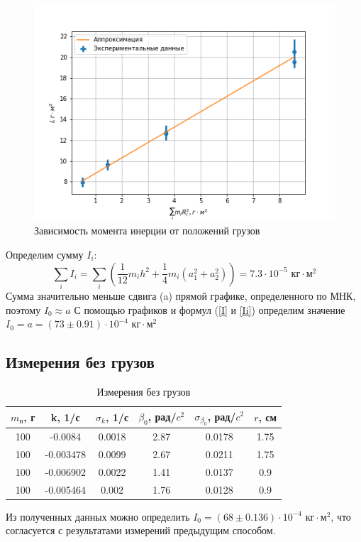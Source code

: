 \documentclass[a4paper,12pt]{article} %
\begin{document}
\begin{figure}[h!]
\begin{center}
\includegraphics[width=\textwidth]{I(mr2)}
\end{center}
\caption{Зависимость момента инерции от положений грузов} \label{Imr2}
\end{figure}

Определим сумму $I_i$:
\[\sum_i I_i = \sum_i(\frac{1}{12}m_ih^2+\frac{1}{4}m_i(a_1^2+a_2^2)) = 7.3 \cdot 10^{-5} \text{ кг} \cdot \text{м}^2\]
Сумма значительно меньше сдвига (a) прямой графике, определенного по МНК, поэтому $I_0 \approx a$
С помощью графиков и формул (\ref{I} и \ref{Ii}) определим значение $I_0 = a = (73 \pm 0.91) \cdot 10^{-4} \text{ кг} \cdot \text{м}^2$

\subsection{Измерения без грузов}

\begin{table}
\caption{Измерения без грузов}
\label{mconst}
\begin{tabular}{|c|c|c|c|c|c|}
\hline 
$m_\text{п}$, г & k, 1/с & $\sigma_k$, 1/с & $\beta_0$, рад/$c^2$ & $\sigma_{\beta_0}$, рад/$c^2$ & $r$, см \\
\hline
100 & -0.0084  & 0.0018 & 2.87 & 0.0178 & 1.75\\
\hline
100 & -0.003478 & 0.0099 & 2.67 & 0.0211 & 1.75\\
\hline
100 & -0.006902 & 0.0022 & 1.41 & 0.0137 & 0.9\\
\hline
100 & -0.005464 & 0.002 & 1.76 & 0.0128 & 0.9\\
\hline
\end{tabular}
\end{table}
Из полученных данных можно определить $I_0 = (68 \pm 0.136) \cdot 10^{-4} \text{ кг} \cdot \text{м}^2$, что согласуется с результатами измерений предыдущим способом.
\end{document}

